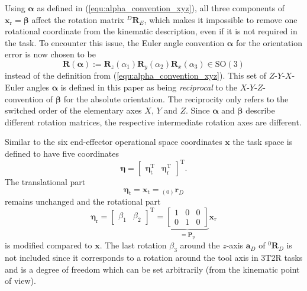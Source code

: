\documentclass{svproc}
\newcommand{\bm}[1]{\boldsymbol{#1}}
\newcommand{\ortvek}[4]{{ }_{(#1)}{\boldsymbol{#2}}^{#3}_{#4} }
\newcommand{\rotmat}[2]{{{ }^{#1}\boldsymbol{R}}_{#2}}
\newcommand{\transp}[0]{{\mathrm{T}}}
\begin{document}
Using $\bm{\alpha}$ as defined in (\ref{equ:alpha_convention_xyz}), all three components of $\bm{x}_{\mathrm{r}}=\bm{\beta}$ affect the rotation matrix $\rotmat{D}{E}$, which makes it impossible to remove one rotational coordinate from the kinematic description, even if it is not required in the task.
%
To encounter this issue, the Euler angle convention $\bm{\alpha}$ for the orientation error is now chosen to be 
%
\begin{equation}
\bm{R}(\bm{\alpha}) := \bm{R}_z(\alpha_1) \bm{R}_y(\alpha_2) \bm{R}_x(\alpha_3) \in \mathrm{SO(3)}
\label{equ:def_rmat_zyxr}
\end{equation}
%
instead of the definition from (\ref{equ:alpha_convention_xyz}).
This set of $Z$-$Y$-$X$-Euler angles $\bm{\alpha}$ is defined in this paper as being \emph{reciprocal} to the $X$-$Y$-$Z$-convention of $\bm{\beta}$ for the absolute orientation.
%
The reciprocity only refers to the switched order of the elementary axes $X$, $Y$ and $Z$.
Since $\bm{\alpha}$ and $\bm{\beta}$ describe different rotation matrices, the respective intermediate rotation axes are different.

Similar to the six end-effector operational space coordinates $\bm{x}$ the task space is defined to have five coordinates
%
\begin{equation}
\bm{\eta}
=
\begin{bmatrix}
\bm{\eta}_{\mathrm{t}}^\transp & 
\bm{\eta}_{\mathrm{r}}^\transp
\end{bmatrix}^\transp.
\end{equation}  
%
The translational part
%
\begin{equation}
\bm{\eta}_{\mathrm{t}}
=
\bm{x}_{\mathrm{t}}
=
\ortvek{0}{r}{}{D}
\end{equation}  
%
remains unchanged and the rotational part
%
\begin{equation}
\bm{\eta}_{\mathrm{r}}
=
\begin{bmatrix}
\beta_1  & \beta_2
\end{bmatrix}^\transp
=
\underbrace{\begin{bmatrix}
1 & 0 & 0  \\ 
0 & 1 & 0
\end{bmatrix}}_{=\bm{P}_{\eta}}
\bm{x}_{\mathrm{r}}
\label{equ:etar_def}
\end{equation}
%
is modified compared to $\bm{x}$.
The last rotation $\beta_3$ around the $z$-axis $\bm{a}_{D}$ of $\rotmat{0}{D}$ is not included since it corresponds to a rotation around the tool axis in 3T2R tasks and is a degree of freedom which can be set arbitrarily (from the kinematic point of view).
\end{document}
